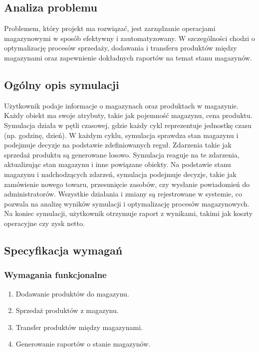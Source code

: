 \documentclass[11pt]{article}
\begin{document}
\subsection{Analiza problemu}
Problemem, który projekt ma rozwiązać, jest zarządzanie operacjami magazynowymi w sposób efektywny i zautomatyzowany. W szczególności chodzi o optymalizację procesów sprzedaży, dodawania i transferu produktów między magazynami oraz zapewnienie dokładnych raportów na temat stanu magazynów.

\subsection{Ogólny opis symulacji}
Użytkownik podaje informacje o magazynach oraz produktach w magazynie. Każdy obiekt ma swoje atrybuty, takie jak pojemność magazynu, cena produktu. Symulacja działa w pętli czasowej, gdzie każdy cykl reprezentuje jednostkę czasu (np. godzinę, dzień). W każdym cyklu, symulacja sprawdza stan magazynu i podejmuje decyzje na podstawie zdefiniowanych reguł. Zdarzenia takie jak sprzedaż produktu są generowane losowo. Symulacja reaguje na te zdarzenia, aktualizując stan magazynu i inne powiązane obiekty. Na podstawie stanu magazynu i nadchodzących zdarzeń, symulacja podejmuje decyzje, takie jak zamówienie nowego towaru, przesunięcie zasobów, czy wysłanie powiadomień do administratorów. Wszystkie działania i zmiany są rejestrowane w systemie, co pozwala na analizę wyników symulacji i optymalizację procesów magazynowych. 
Na koniec symulacji, użytkownik otrzymuje raport z wynikami, takimi jak koszty operacyjne czy zysk netto.

\subsection{Specyfikacja wymagań}
\subsubsection{Wymagania funkcjonalne}

\begin{enumerate}
    \item Dodawanie produktów do magazynu.
    \item Sprzedaż produktów z magazynu.
    \item Transfer produktów między magazynami.
    \item Generowanie raportów o stanie magazynów.
\end{enumerate}
\end{document}
